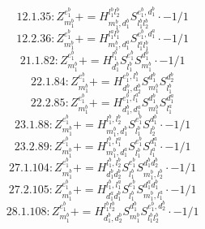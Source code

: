 \documentclass[letterpaper,10pt,fleqn,leqno,onecolumn]{article}
\begin{document}
\begin{equation} \;\;\;\;\;\;  12.1.35: Z^{e_{1}^{b}}_{m_{1}^{b}}+=H^{l_{1}^{b}l_{2}^{b}}_{m_{1}^{b},d_{1}^{b}}S^{e_{1}^{b},d_{1}^{b}}_{l_{1}^{b}l_{2}^{b}}\cdot -1/1 \end{equation}
\begin{equation} \;\;\;\;\;\;  12.2.36: Z^{e_{1}^{b}}_{m_{1}^{b}}+=H^{l_{1}^{a}l_{1}^{b}}_{m_{1}^{b},d_{1}^{a}}S^{e_{1}^{b},d_{1}^{a}}_{l_{1}^{a}l_{1}^{b}}\cdot -1/1 \end{equation}
\begin{equation} \;\;\;\;\;\;  21.1.82: Z^{e_{1}^{b}}_{m_{1}^{b}}+=H^{l_{1}^{b}}_{d_{1}^{b}}S^{e_{1}^{b}}_{l_{1}^{b}}S^{d_{1}^{b}}_{m_{1}^{b}}\cdot -1/1 \end{equation}
\begin{equation} \;\;\;\;\;\;  22.1.84: Z^{e_{1}^{b}}_{m_{1}^{b}}+=H^{e_{1}^{b},l_{1}^{b}}_{d_{1}^{b},d_{2}^{b}}S^{d_{1}^{b}}_{m_{1}^{b}}S^{d_{2}^{b}}_{l_{1}^{b}} \end{equation}
\begin{equation} \;\;\;\;\;\;  22.2.85: Z^{e_{1}^{b}}_{m_{1}^{b}}+=H^{e_{1}^{b},l_{1}^{a}}_{d_{1}^{b},d_{1}^{a}}S^{d_{1}^{b}}_{m_{1}^{b}}S^{d_{1}^{a}}_{l_{1}^{a}} \end{equation}
\begin{equation} \;\;\;\;\;\;  23.1.88: Z^{e_{1}^{b}}_{m_{1}^{b}}+=H^{l_{1}^{b},l_{2}^{b}}_{m_{1}^{b},d_{1}^{b}}S^{e_{1}^{b}}_{l_{1}^{b}}S^{d_{1}^{b}}_{l_{2}^{b}}\cdot -1/1 \end{equation}
\begin{equation} \;\;\;\;\;\;  23.2.89: Z^{e_{1}^{b}}_{m_{1}^{b}}+=H^{l_{1}^{b},l_{1}^{a}}_{m_{1}^{b},d_{1}^{a}}S^{e_{1}^{b}}_{l_{1}^{b}}S^{d_{1}^{a}}_{l_{1}^{a}}\cdot -1/1 \end{equation}
\begin{equation} \;\;\;\;\;\;  27.1.104: Z^{e_{1}^{b}}_{m_{1}^{b}}+=H^{l_{1}^{b},l_{2}^{b}}_{d_{1}^{b}d_{2}^{b}}S^{e_{1}^{b}}_{l_{1}^{b}}S^{d_{1}^{b}d_{2}^{b}}_{m_{1}^{b},l_{2}^{b}}\cdot -1/1 \end{equation}
\begin{equation} \;\;\;\;\;\;  27.2.105: Z^{e_{1}^{b}}_{m_{1}^{b}}+=H^{l_{1}^{b},l_{1}^{a}}_{d_{1}^{a}d_{1}^{b}}S^{e_{1}^{b}}_{l_{1}^{b}}S^{d_{1}^{a}d_{1}^{b}}_{m_{1}^{b},l_{1}^{a}}\cdot -1/1 \end{equation}
\begin{equation} \;\;\;\;\;\;  28.1.108: Z^{e_{1}^{b}}_{m_{1}^{b}}+=H^{l_{1}^{b}l_{2}^{b}}_{d_{1}^{b},d_{2}^{b}}S^{d_{1}^{b}}_{m_{1}^{b}}S^{e_{1}^{b},d_{2}^{b}}_{l_{1}^{b}l_{2}^{b}}\cdot -1/1 \end{equation}
\end{document}

